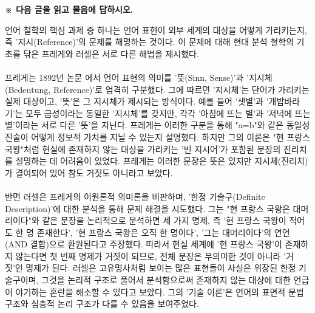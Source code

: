 \documentclass[10pt,a4paper]{article}
\begin{document}
\vspace{4mm}
{\small\textbf{※ 다음 글을 읽고 물음에 답하시오.}}
\vspace{2mm}
\begin{tcolorbox}[passage]
언어 철학의 핵심 과제 중 하나는 언어 표현이 외부 세계의 대상을 어떻게 가리키는지, 즉 '지시(Reference)'의 문제를 해명하는 것이다. 이 문제에 대해 현대 분석 철학의 기초를 닦은 프레게와 러셀은 서로 다른 해법을 제시했다. \\{}
\vspace{4pt} \\{}
프레게는 1892년 논문 에서 언어 표현의 의미를 '뜻(Sinn, Sense)'과 '지시체(Bedeutung, Reference)'로 엄격히 구분했다. 그에 따르면 '지시체'는 단어가 가리키는 실제 대상이고, '뜻'은 그 지시체가 제시되는 방식이다. 예를 들어 '샛별'과 '개밥바라기'는 모두 금성이라는 동일한 '지시체'를 갖지만, 각각 '아침에 뜨는 별'과 '저녁에 뜨는 별'이라는 서로 다른 '뜻'을 지닌다. 프레게는 이러한 구분을 통해 "a=b"와 같은 동일성 진술이 어떻게 정보적 가치를 지닐 수 있는지 설명했다. 하지만 그의 이론은 "현 프랑스 국왕"처럼 현실에 존재하지 않는 대상을 가리키는 '빈 지시어'가 포함된 문장의 진리치를 설명하는 데 어려움이 있었다. 프레게는 이러한 문장은 뜻은 있지만 지시체(진리치)가 결여되어 있어 참도 거짓도 아니라고 보았다. \\{}
\vspace{4pt} \\{}
반면 러셀은 프레게의 이원론적 의미론을 비판하며, '한정 기술구(Definite Description)'에 대한 분석을 통해 문제 해결을 시도했다. 그는 "현 프랑스 국왕은 대머리이다"와 같은 문장을 논리적으로 분석하면 세 가지 명제, 즉 '현 프랑스 국왕이 적어도 한 명 존재한다', '현 프랑스 국왕은 오직 한 명이다', '그는 대머리이다'의 연언(AND 결합)으로 환원된다고 주장했다. 따라서 현실 세계에 '현 프랑스 국왕'이 존재하지 않는다면 첫 번째 명제가 거짓이 되므로, 전체 문장은 무의미한 것이 아니라 '거짓'인 명제가 된다. 러셀은 고유명사처럼 보이는 많은 표현들이 사실은 위장된 한정 기술구이며, 그것을 논리적 구조로 풀어서 분석함으로써 존재하지 않는 대상에 대한 언급이 야기하는 혼란을 해소할 수 있다고 보았다. 그의 '기술 이론'은 언어의 표면적 문법 구조와 심층적 논리 구조가 다를 수 있음을 보여주었다.
\end{tcolorbox}
\vspace{3mm}
\end{document}
